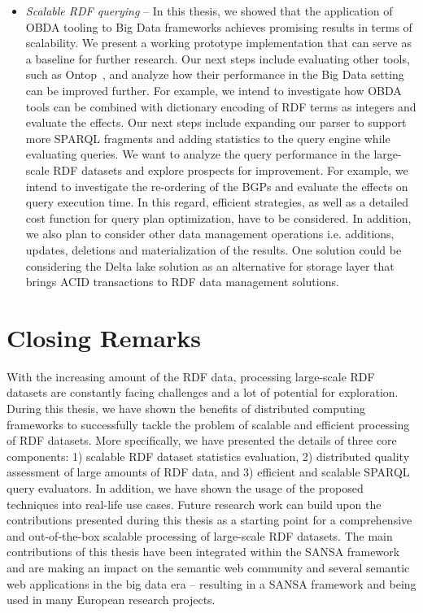 \begin{itemize}
    \item \textit{Scalable \gls{RDF} querying} -- 
    In this thesis, we showed that the application of OBDA tooling to Big Data frameworks achieves promising results in terms of scalability. 
    We present a working prototype implementation that can serve as a baseline for further research. 
    Our next steps include evaluating other tools, such as Ontop~\cite{Calvanese2017OntopAS}, and analyze how their performance in the Big Data setting can be improved further. 
    For example, we intend to investigate how OBDA tools can be combined with dictionary encoding of \gls{RDF} terms as integers and evaluate the effects.
    Our next steps include expanding our parser to support more \gls{SPARQL} fragments and adding statistics to the query engine while evaluating queries. 
    We want to analyze the query performance in the large-scale \gls{RDF} datasets and explore prospects for improvement.
    For example, we intend to investigate the re-ordering of the \gls{BGP}s and evaluate the effects on query execution time.
    In this regard, efficient strategies, as well as a detailed cost function for query plan optimization, have to be considered.
    In addition, we also plan to consider other data management operations i.e. additions, updates, deletions and materialization of the results.
    One solution could be considering the Delta lake solution as an alternative for storage layer that brings ACID transactions to \gls{RDF} data management solutions.
\end{itemize}

\section{Closing Remarks}
With the increasing amount of the \gls{RDF} data, processing large-scale \gls{RDF} datasets are constantly facing challenges and a lot of potential for exploration.
During this thesis, we have shown the benefits of distributed computing frameworks to successfully tackle the problem of scalable and efficient processing of \gls{RDF} datasets.
More specifically, we have presented the details of three core components: 1) scalable \gls{RDF} dataset statistics evaluation, 2) distributed quality assessment of large amounts of \gls{RDF} data, and 3) efficient and scalable \gls{SPARQL} query evaluators.
In addition, we have shown the usage of the proposed techniques into real-life use cases.
Future research work can build upon the contributions presented during this thesis as a starting point for a comprehensive and out-of-the-box scalable processing of large-scale \gls{RDF} datasets.
The main contributions of this thesis have been integrated within the SANSA framework and are making an impact on the semantic web community and several semantic web applications in the big data era -- resulting in a SANSA framework and being used in many European research projects.


